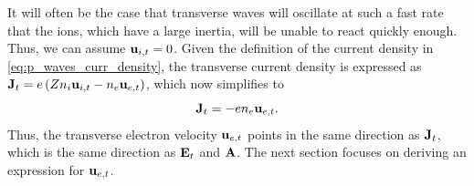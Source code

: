 \documentclass[a4paper,11pt]{report}
\begin{document}
It will often be the case that transverse waves will oscillate at such a fast rate that the ions, which have a large inertia, will be unable to react quickly enough. Thus, we can assume $\mathbf{u}_{i,t} = 0$. Given the definition of the current density in \cref{eq:p_waves_curr_density}, the transverse current density is expressed as $\mathbf{J}_t = e \left (Z n_i \mathbf{u}_{i,t} - n_e \mathbf{u}_{e,t} \right )$, which now simplifies to 
\begin{equation}
    \label{eq:emp_transverse_current}
    \mathbf{J}_t = -e n_e \mathbf{u}_{e,t}.
\end{equation}
Thus, the transverse electron velocity $\mathbf{u}_{e,t}$ points in the same direction as $\mathbf{J}_t$, which is the same direction as $\mathbf{E}_t$ and $\mathbf{A}$. The next section focuses on deriving an expression for $\mathbf{u}_{e,t}$. 
\end{document}
